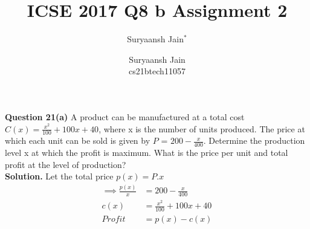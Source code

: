 \documentclass[journal,12pt,twocolumn]{IEEEtran}
\begin{document}
\makeatletter
{}
\makeatother
\let\StandardTheFigure\thefigure
\let\vec\mathbf
\renewcommand{\thefigure}{\theproblem}
\def\putbox#1#2#3{\makebox[0in][l]{\makebox[#1][l]{}\raisebox{\baselineskip}[0in][0in]{\raisebox{#2}[0in][0in]{#3}}}}
     \def\rightbox#1{\makebox[0in][r]{#1}}
     \def\centbox#1{\makebox[0in]{#1}}
     \def\topbox#1{\raisebox{-\baselineskip}[0in][0in]{#1}}
     \def\midbox#1{\raisebox{-0.5\baselineskip}[0in][0in]{#1}}
\vspace{3cm}
\title{
	ICSE 2017 Q8 b
}
\author{ Suryaansh Jain$^{*}$%
	
}	
\maketitle
\newpage
\bigskip
\renewcommand{\thefigure}{\theenumi}
\renewcommand{\thetable}{\theenumi}
\title{Assignment 2 \\}
\author{Suryaansh Jain \\ \normalsize cs21btech11057 \\}

	\maketitle
	
	\textbf{Question 21(a)} 
	A product can be manufactured at a total cost $C(x) = \frac{x^{2}}{100}+100x+40$, where x
is the number of units produced. The price at which each unit can be sold is given
by $P$ = $200 - \frac{x}{400}$. Determine the production level x at which the profit is
maximum. What is the price per unit and total profit at the level of production? \\
	
	
	\textbf{Solution.}	
	Let the total price $p(x) = P.x$ \\
	\begin{align}
		\implies \frac{p(x)}{x} &= 200 - \frac{x}{400} \\
		c(x) &= \frac{x^{2}}{100} + 100x + 40 \\
		Profit &= p(x) - c(x)
	\end{align}
	
\end{document}
